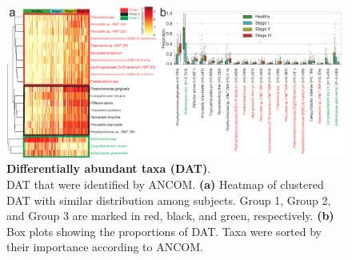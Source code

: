 \documentclass[11pt, a4paper, onecolumn, oneside]{report}
\begin{document}
            \begin{figure}[p]
                \centering
                \includegraphics[width=\linewidth]{Figures/Periodontitis/Figure_2.pdf}
                \caption[Differentially abundant taxa (DAT)]{\textbf{Differentially abundant taxa (DAT)}. \\
                    DAT that were identified by ANCOM. \textbf{(a)} Heatmap of clustered DAT with similar distribution among subjects. Group 1, Group 2, and Group 3 are marked in red, black, and green, respectively. \textbf{(b)} Box plots showing the proportions of DAT. Taxa were sorted by their importance according to ANCOM.}
                \label{fig:Periodontitis-DAT}
            \end{figure}
            \clearpage
\end{document}
